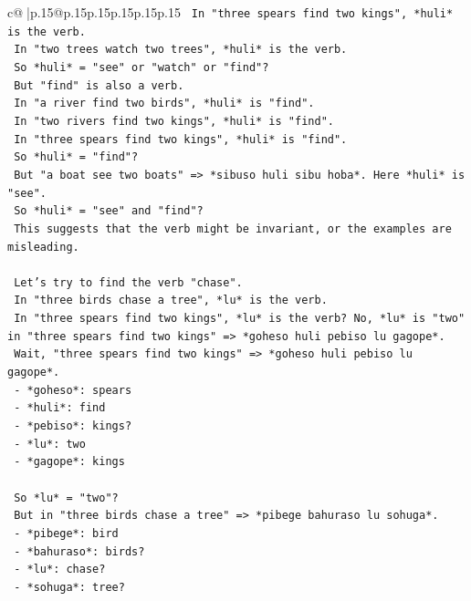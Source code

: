 \documentclass{article}
\begin{document}
{\begin{supertabular}{c@{$\;$}|p{.15\linewidth}@{}p{.15\linewidth}p{.15\linewidth}p{.15\linewidth}p{.15\linewidth}p{.15\linewidth}}
{{{\texttt{   In "three spears find two kings", *huli* is the verb.} \\
\texttt{   In "two trees watch two trees", *huli* is the verb.} \\
\texttt{   So *huli* = "see" or "watch" or "find"?} \\
\texttt{   But "find" is also a verb.} \\
\texttt{   In "a river find two birds", *huli* is "find".} \\
\texttt{   In "two rivers find two kings", *huli* is "find".} \\
\texttt{   In "three spears find two kings", *huli* is "find".} \\
\texttt{   So *huli* = "find"?} \\
\texttt{   But "a boat see two boats" => *sibuso huli sibu hoba*. Here *huli* is "see".} \\
\texttt{   So *huli* = "see" and "find"?} \\
\texttt{   This suggests that the verb might be invariant, or the examples are misleading.} \\
\\ 
\texttt{   Let's try to find the verb "chase".} \\
\texttt{   In "three birds chase a tree", *lu* is the verb.} \\
\texttt{   In "three spears find two kings", *lu* is the verb? No, *lu* is "two" in "three spears find two kings" => *goheso huli pebiso lu gagope*.} \\
\texttt{   Wait, "three spears find two kings" => *goheso huli pebiso lu gagope*.} \\
\texttt{   {-} *goheso*: spears} \\
\texttt{   {-} *huli*: find} \\
\texttt{   {-} *pebiso*: kings?} \\
\texttt{   {-} *lu*: two} \\
\texttt{   {-} *gagope*: kings} \\
\\ 
\texttt{   So *lu* = "two"?} \\
\texttt{   But in "three birds chase a tree" => *pibege bahuraso lu sohuga*.} \\
\texttt{   {-} *pibege*: bird} \\
\texttt{   {-} *bahuraso*: birds?} \\
\texttt{   {-} *lu*: chase?} \\
\texttt{   {-} *sohuga*: tree?} \\
\\ 
}}}
\end{supertabular}}
\end{document}
